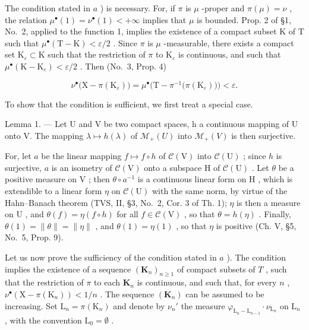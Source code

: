 The condition stated in \(a\) ) is necessary. For, if \(\pi\) is \(\mu\) -proper and \(\pi(\mu) = \nu\) , the relation \(\mu^{\bullet}(1) = \nu^{\bullet}(1) < +\infty\) implies that \(\mu\) is bounded. Prop. 2 of §1, No.~2, applied to the function 1, implies the existence of a compact subset K of T such that \(\mu^{\bullet}(\mathrm{T} - \mathrm{K}) < \varepsilon/2\) . Since \(\pi\) is \(\mu\) -measurable, there exists a compact set \(\mathrm{K}_{\varepsilon} \subset \mathrm{K}\) such that the restriction of \(\pi\) to \(\mathrm{K}_{\varepsilon}\) is continuous, and such that \(\mu^{\bullet}(\mathrm{K} - \mathrm{K}_{\varepsilon}) < \varepsilon/2\) . Then (No.~3, Prop. 4)

\[
\nu^ {\bullet} \big (\mathrm{X} - \pi (\mathrm{K} _ {\varepsilon}) \big) = \mu^ {\bullet} \big (\mathrm{T} - \pi^{-1} \big (\pi (\mathrm{K} _ {\varepsilon}) \big) \big) <   \varepsilon .
\]

To show that the condition is sufficient, we first treat a special case.

Lemma 1. --- Let U and V be two compact spaces, h a continuous mapping of U onto V. The mapping \(\lambda \mapsto h(\lambda)\) of \(\mathcal{M}_{+}(U)\) into \(\mathcal{M}_{+}(V)\) is then surjective.

For, let \(a\) be the linear mapping \(f \mapsto f \circ h\) of \(\mathcal{C}(\mathrm{V})\) into \(\mathcal{C}(\mathrm{U})\) ; since \(h\) is surjective, \(a\) is an isometry of \(\mathcal{C}(\mathrm{V})\) onto a subspace \(\mathrm{H}\) of \(\mathcal{C}(\mathrm{U})\) . Let \(\theta\) be a positive measure on \(\mathrm{V}\) ; then \(\theta \circ a^{-1}\) is a continuous linear form on \(\mathrm{H}\) , which is extendible to a linear form \(\eta\) on \(\mathcal{C}(\mathrm{U})\) with the same norm, by virtue of the Hahn--Banach theorem (TVS, II, §3, No.~2, Cor. 3 of Th. 1); \(\eta\) is then a measure on \(\mathrm{U}\) , and \(\theta(f) = \eta(f \circ h)\) for all \(f \in \mathcal{C}(\mathrm{V})\) , so that \(\theta = h(\eta)\) . Finally, \(\theta(1) = \| \theta \| = \| \eta \|\) , and \(\theta(1) = \eta(1)\) , so that \(\eta\) is positive (Ch. V, §5, No.~5, Prop. 9).

Let us now prove the sufficiency of the condition stated in \(a\) ). The condition implies the existence of a sequence \((\mathbf{K}_n)_{n \geqslant 1}\) of compact subsets of \(T\) , such that the restriction of \(\pi\) to each \(\mathbf{K}_n\) is continuous, and such that, for every \(n\) , \(\nu^{\bullet}(\mathrm{X} - \pi(\mathrm{K}_n)) < 1/n\) . The sequence \((\mathbf{K}_n)\) can be assumed to be increasing. Set \(\mathrm{L}_n = \pi(\mathrm{K}_n)\) and denote by \(\nu_n'\) the measure \(\varphi_{\mathrm{L}_n - \mathrm{L}_{n-1}} \cdot \nu_{\mathrm{L}_n}\) on \(\mathrm{L}_n\) , with the convention \(\mathrm{L}_0 = \emptyset\) .

